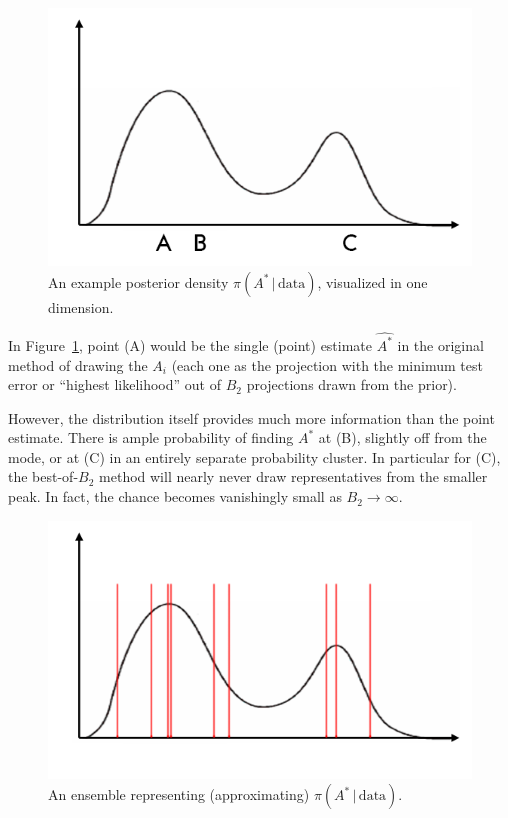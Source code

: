 \documentclass[ejs,preprint]{imsart}
\begin{document}
\begin{figure}
\begin{centering}
\includegraphics[scale=0.4]{illustration1}
\caption{An example posterior density $\pi(A^*\,|\,\mathrm{data})$, visualized in one dimension.
\label{fig:illust1}}
\par\end{centering}
\end{figure}

In Figure~\ref{fig:illust1}, point (A) would be the single (point) estimate $\widehat{A^*}$ in the original method of drawing the $A_i$ (each one as the projection with the minimum test error or ``highest likelihood'' out of $B_2$ projections drawn from the prior).

However, the distribution itself provides much more information than the point estimate. There is ample probability of finding $A^*$ at (B), slightly off from the mode, or at (C) in an entirely separate probability cluster. In particular for (C), the best-of-$B_2$ method will nearly never draw representatives from the smaller peak. In fact, the chance becomes vanishingly small as $B_2\to\infty$.

\begin{figure}
\begin{centering}
\includegraphics[scale=0.4]{illustration2}
\par\end{centering}
\caption{An ensemble representing (approximating) $\pi(A^*\,|\,\mathrm{data})$.}
\label{fig:illust2}
\end{figure}
\end{document}

